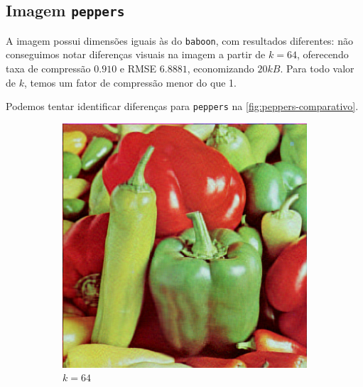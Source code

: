 \documentclass[brazilian,a4paper,twocolumn]{article}
\begin{document}
    \subsection{Imagem \texttt{peppers}}

        A imagem possui dimensões iguais às do \texttt{baboon}, com resultados diferentes: não conseguimos notar diferenças visuais na imagem a partir de $k = 64$, oferecendo taxa de compressão $0.910$ e RMSE $6.8881$, economizando $20kB$. Para todo valor de $k$, temos um fator de compressão menor do que 1.

        Podemos tentar identificar diferenças para \texttt{peppers} na \cref{fig:peppers-comparativo}.

        \begin{figure}[H]
            \centering
            \begin{subfigure}{0.15\textwidth}
                \includegraphics[width=\textwidth,keepaspectratio]{peppers-64}
                \caption{$k=64$}
                \label{fig:peppers-64}
            \end{subfigure}
            \begin{subfigure}{0.15\textwidth}

\end{subfigure}
\end{figure}
\end{document}
